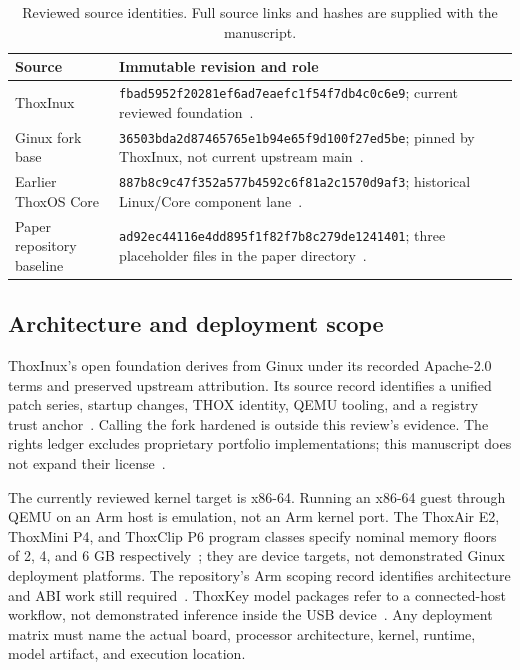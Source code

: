 \documentclass[11pt,a4paper]{article}
\begin{document}
\begin{table}[htbp]
\centering\small
\caption{Reviewed source identities. Full source links and hashes are supplied with the manuscript.}
\label{tab:revisions}
\begin{tabularx}{\textwidth}{P{0.28\textwidth}Y}
\toprule
Source & Immutable revision and role \\
\midrule
ThoxInux & \nolinkurl{fbad5952f20281ef6ad7eaefc1f54f7db4c0c6e9}; current reviewed foundation~\cite{thoxinux}. \\
Ginux fork base & \nolinkurl{36503bda2d87465765e1b94e65f9d100f27ed5be}; pinned by ThoxInux, not current upstream main~\cite{upstream}. \\
Earlier ThoxOS Core & \nolinkurl{887b8c9c47f352a577b4592c6f81a2c1570d9af3}; historical Linux/Core component lane~\cite{core}. \\
Paper repository baseline & \nolinkurl{ad92ec44116e4dd895f1f82f7b8c279de1241401}; three placeholder files in the paper directory~\cite{paperrepo}. \\
\bottomrule
\end{tabularx}
\end{table}

\subsection{Architecture and deployment scope}
ThoxInux's open foundation derives from Ginux under its recorded Apache-2.0 terms and preserved upstream attribution. Its source record identifies a unified patch series, startup changes, THOX identity, QEMU tooling, and a registry trust anchor~\cite{upstream}. Calling the fork hardened is outside this review's evidence. The rights ledger excludes proprietary portfolio implementations; this manuscript does not expand their license~\cite{rights}.

The currently reviewed kernel target is x86-64. Running an x86-64 guest through QEMU on an Arm host is emulation, not an Arm kernel port. The ThoxAir E2, ThoxMini P4, and ThoxClip P6 program classes specify nominal memory floors of 2, 4, and 6 GB respectively~\cite{historical}; they are device targets, not demonstrated Ginux deployment platforms. The repository's Arm scoping record identifies architecture and ABI work still required~\cite{arm}. ThoxKey model packages refer to a connected-host workflow, not demonstrated inference inside the USB device~\cite{model08}. Any deployment matrix must name the actual board, processor architecture, kernel, runtime, model artifact, and execution location.
\end{document}
